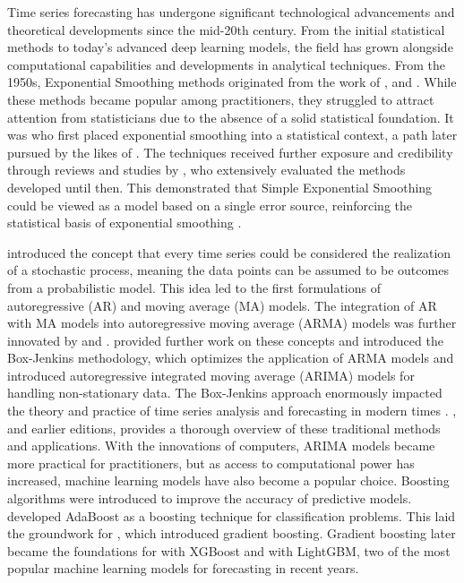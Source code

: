 \documentclass[12pt,a4paper]{article}
\begin{document}
Time series forecasting has undergone significant technological advancements and theoretical developments since the mid-20th century. From the initial statistical methods to today's advanced deep learning models, the field has grown alongside computational capabilities and developments in analytical techniques. From the 1950s, Exponential Smoothing methods originated from the work of \cite{Brown1959,brown1963smoothing}, \cite{holt1957forecasting} and \cite{Winters1960ForecastingSB}. While these methods became popular among practitioners, they struggled to attract attention from statisticians due to the absence of a solid statistical foundation. It was \cite{Muth1960} who first placed exponential smoothing into a statistical context, a path later pursued by the likes of \cite{box1970time}. The techniques received further exposure and credibility through reviews and studies by \cite{Gardner1985}, who extensively evaluated the methods developed until then. This demonstrated that Simple Exponential Smoothing could be viewed as a model based on a single error source, reinforcing the statistical basis of exponential smoothing \parencite{DEGOOIJER2006443}.

\cite{Yule1927} introduced the concept that every time series could be considered the realization of a stochastic process, meaning the data points can be assumed to be outcomes from a probabilistic model. This idea led to the first formulations of autoregressive (AR) and moving average (MA) models. The integration of AR with MA models into autoregressive moving average (ARMA) models was further innovated by \cite{Slutzky1937} and \cite{wold1939}. \cite{box1970time} provided further work on these concepts and introduced the Box-Jenkins methodology, which optimizes the application of ARMA models and introduced autoregressive integrated moving average (ARIMA) models for handling non-stationary data. The Box-Jenkins approach enormously impacted the theory and practice of time series analysis and forecasting in modern times \parencite{DEGOOIJER2006443}. \cite{HyndmanForecasting2021}, and earlier editions, provides a thorough overview of these traditional methods and applications. With the innovations of computers, ARIMA models became more practical for practitioners, but as access to computational power has increased, machine learning models have also become a popular choice. Boosting algorithms were introduced to improve the accuracy of predictive models. \cite{Freund1997} developed AdaBoost as a boosting technique for classification problems. This laid the groundwork for \cite{Friedman2001}, which introduced gradient boosting. Gradient boosting later became the foundations for \cite{Chen_2016} with XGBoost and \cite{guolin2017} with LightGBM, two of the most popular machine learning models for forecasting in recent years.
\end{document}
